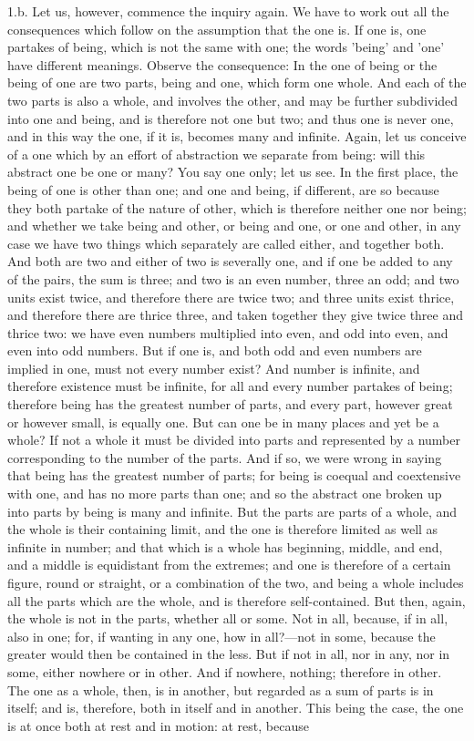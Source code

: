 \documentclass[11pt,letter]{article}
\begin{document}
\par  1.b. Let us, however, commence the inquiry again. We have to work out all the consequences which follow on the assumption that the one is. If one is, one partakes of being, which is not the same with one; the words 'being' and 'one' have different meanings. Observe the consequence: In the one of being or the being of one are two parts, being and one, which form one whole. And each of the two parts is also a whole, and involves the other, and may be further subdivided into one and being, and is therefore not one but two; and thus one is never one, and in this way the one, if it is, becomes many and infinite. Again, let us conceive of a one which by an effort of abstraction we separate from being: will this abstract one be one or many? You say one only; let us see. In the first place, the being of one is other than one; and one and being, if different, are so because they both partake of the nature of other, which is therefore neither one nor being; and whether we take being and other, or being and one, or one and other, in any case we have two things which separately are called either, and together both. And both are two and either of two is severally one, and if one be added to any of the pairs, the sum is three; and two is an even number, three an odd; and two units exist twice, and therefore there are twice two; and three units exist thrice, and therefore there are thrice three, and taken together they give twice three and thrice two: we have even numbers multiplied into even, and odd into even, and even into odd numbers. But if one is, and both odd and even numbers are implied in one, must not every number exist? And number is infinite, and therefore existence must be infinite, for all and every number partakes of being; therefore being has the greatest number of parts, and every part, however great or however small, is equally one. But can one be in many places and yet be a whole? If not a whole it must be divided into parts and represented by a number corresponding to the number of the parts. And if so, we were wrong in saying that being has the greatest number of parts; for being is coequal and coextensive with one, and has no more parts than one; and so the abstract one broken up into parts by being is many and infinite. But the parts are parts of a whole, and the whole is their containing limit, and the one is therefore limited as well as infinite in number; and that which is a whole has beginning, middle, and end, and a middle is equidistant from the extremes; and one is therefore of a certain figure, round or straight, or a combination of the two, and being a whole includes all the parts which are the whole, and is therefore self-contained. But then, again, the whole is not in the parts, whether all or some. Not in all, because, if in all, also in one; for, if wanting in any one, how in all?—not in some, because the greater would then be contained in the less. But if not in all, nor in any, nor in some, either nowhere or in other. And if nowhere, nothing; therefore in other. The one as a whole, then, is in another, but regarded as a sum of parts is in itself; and is, therefore, both in itself and in another. This being the case, the one is at once both at rest and in motion: at rest, because 
\end{document}

